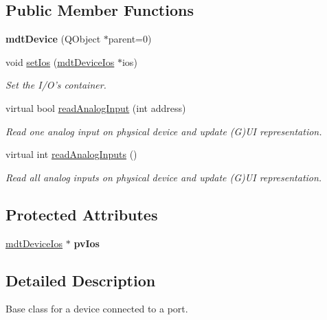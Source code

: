 \subsection*{Public Member Functions}
\begin{DoxyCompactItemize}
\item 
\hypertarget{classmdt_device_a6d501791e7243358cc61b144254b80db}{
{\bfseries mdtDevice} (QObject $\ast$parent=0)}
\label{classmdt_device_a6d501791e7243358cc61b144254b80db}

\item 
void \hyperlink{classmdt_device_ad1f8fff7f40ab77e876fbfaeae846f82}{setIos} (\hyperlink{classmdt_device_ios}{mdtDeviceIos} $\ast$ios)
\begin{DoxyCompactList}\small\item\em Set the I/O's container. \end{DoxyCompactList}\item 
virtual bool \hyperlink{classmdt_device_a5059e971d265dcc125e507de856271b9}{readAnalogInput} (int address)
\begin{DoxyCompactList}\small\item\em Read one analog input on physical device and update (G)UI representation. \end{DoxyCompactList}\item 
virtual int \hyperlink{classmdt_device_ac0023742214c29bdadd46383ae240972}{readAnalogInputs} ()
\begin{DoxyCompactList}\small\item\em Read all analog inputs on physical device and update (G)UI representation. \end{DoxyCompactList}\end{DoxyCompactItemize}
\subsection*{Protected Attributes}
\begin{DoxyCompactItemize}
\item 
\hypertarget{classmdt_device_aa84e01b13f98fc35476a2654f1c8d2b3}{
\hyperlink{classmdt_device_ios}{mdtDeviceIos} $\ast$ {\bfseries pvIos}}
\label{classmdt_device_aa84e01b13f98fc35476a2654f1c8d2b3}

\end{DoxyCompactItemize}


\subsection{Detailed Description}
Base class for a device connected to a port. 

